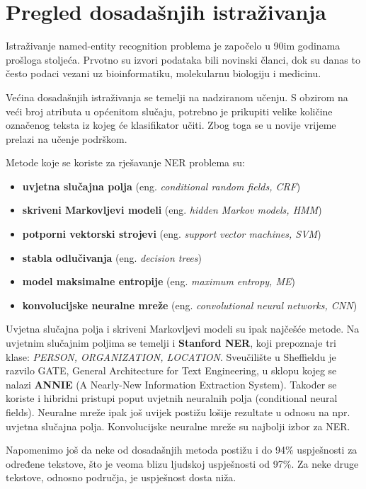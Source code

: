 \documentclass[]{article}
\begin{document}
	\section{Pregled dosadašnjih istraživanja}
	
	Istraživanje named-entity recognition problema je započelo u 90im godinama prošloga stoljeća. Prvotno su izvori podataka bili novinski članci, dok su danas to često podaci vezani uz bioinformatiku, molekularnu biologiju i medicinu.
	
	Većina dosadašnjih istraživanja se temelji na nadziranom učenju. S obzirom na veći broj atributa u općenitom slučaju, potrebno je prikupiti velike količine označenog teksta iz kojeg će klasifikator učiti. Zbog toga se u novije vrijeme prelazi na učenje podrškom.
	
	Metode koje se koriste za rješavanje NER problema su:
	\begin{itemize}
		\item \textbf{uvjetna slučajna polja} (eng. \textit{conditional random fields, CRF})
		\item \textbf{skriveni Markovljevi modeli} (eng. \textit{hidden Markov models, HMM})
		\item \textbf{potporni vektorski strojevi} (eng. \textit{support vector machines, SVM})
		\item \textbf{stabla odlučivanja} (eng. \textit{decision trees})
		\item \textbf{model maksimalne entropije} (eng. \textit{maximum entropy, ME})
		\item \textbf{konvolucijske neuralne mreže} (eng. \textit{convolutional neural networks, CNN})
	\end{itemize}
	
	Uvjetna slučajna polja i skriveni Markovljevi modeli su ipak najčešće metode. Na uvjetnim slučajnim poljima se temelji i \textbf{Stanford NER}, koji prepoznaje tri klase: \textit{PERSON, ORGANIZATION, LOCATION}. Sveučilište u Sheffieldu je razvilo GATE, General Architecture for Text Engineering, u sklopu kojeg se nalazi \textbf{ANNIE} (A Nearly-New Information Extraction System). Također se koriste i hibridni pristupi poput uvjetnih neuralnih polja (conditional neural fields). Neuralne mreže ipak još uvijek postižu lošije rezultate u odnosu na npr. uvjetna slučajna polja. Konvolucijske neuralne mreže su najbolji izbor za NER.
	
	Napomenimo još da neke od dosadašnjih metoda postižu i do 94\% uspješnosti za određene tekstove, što je veoma blizu ljudskoj uspješnosti od 97\%. Za neke druge tekstove, odnosno područja, je uspješnost dosta niža.
	
\end{document}
